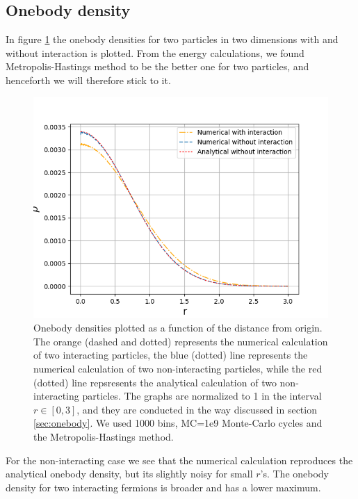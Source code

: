 \documentclass[norsk,a4paper,12pt]{article}
\begin{document}
\subsection{Onebody density}
In figure \ref{fig:OB} the onebody densities for two particles in two dimensions with and without interaction is plotted. From the energy calculations, we found Metropolis-Hastings method to be the better one for two particles, and henceforth we will therefore stick to it. 
 \begin{figure} [H]
 	\centering
 	\includegraphics[scale=0.8]{plots/OB_comparison_MC_1e9.png}
 	\caption{Onebody densities plotted as a function of the distance from origin. The orange (dashed and dotted) represents the numerical calculation of two interacting particles, the blue (dotted) line represents the numerical calculation of two non-interacting particles, while the red (dotted) line repsresents the analytical calculation of two non-interacting particles. The graphs are normalized to 1 in the interval $r\in[0,3]$, and they are conducted in the way discussed in section \ref{sec:onebody}. We used 1000 bins, MC=1e9 Monte-Carlo cycles and the Metropolis-Hastings method.}
 	\label{fig:OB}
 \end{figure}
For the non-interacting case we see that the numerical calculation reproduces the analytical onebody density, but its slightly noisy for small $r$'s. The onebody density for two interacting fermions is broader and has a lower maximum.
 
\end{document}
